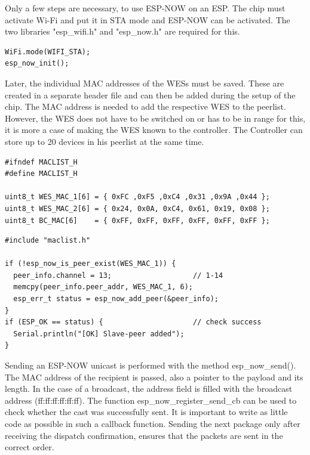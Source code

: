 Only a few steps are necessary, to use ESP-NOW on an ESP.
The chip must activate Wi-Fi and put it in STA mode and ESP-NOW can be activated.
The two libraries "esp\_wifi.h" and "esp\_now.h" are required for this.

\begin{lstlisting}[caption=Init ESP-NOW]
WiFi.mode(WIFI_STA);
esp_now_init();
\end{lstlisting}
\label{lst:init}

Later, the individual MAC addresses of the WESs must be saved.
These are created in a separate header file and can then be added during the setup of the chip.
The MAC address is needed to add the respective WES to the peerlist.
However, the WES does not have to be switched on or has to be in range for this, 
it is more a case of making the WES known to the controller.
The Controller can store up to 20 devices in his peerlist at the same time.

\begin{lstlisting}
#ifndef MACLIST_H
#define MACLIST_H

uint8_t WES_MAC_1[6] = { 0xFC ,0xF5 ,0xC4 ,0x31 ,0x9A ,0x44 };
uint8_t WES_MAC_2[6] = { 0x24, 0x0A, 0xC4, 0x61, 0x19, 0x08 };
uint8_t BC_MAC[6]    = { 0xFF, 0xFF, 0xFF, 0xFF, 0xFF, 0xFF };
\end{lstlisting}
\label{lst:macaddress}

\begin{lstlisting}[caption=Add Peers]
#include "maclist.h"

if (!esp_now_is_peer_exist(WES_MAC_1)) {
  peer_info.channel = 13;                   // 1-14
  memcpy(peer_info.peer_addr, WES_MAC_1, 6);
  esp_err_t status = esp_now_add_peer(&peer_info);
}
if (ESP_OK == status) {                     // check success
  Serial.println("[OK] Slave-peer added"); 
}
\end{lstlisting}

Sending an ESP-NOW unicast is performed with the method esp\_now\_send().
The MAC address of the recipient is passed, also a pointer to the payload and its length.
In the case of a broadcast, the address field is filled with the broadcast address (ff:ff:ff:ff:ff:ff).
The function esp\_now\_register\_send\_cb can be used to check whether the cast was successfully sent.
It is important to write as little code as possible in such a callback function.
Sending the next package only after receiving the dispatch confirmation, 
ensures that the packets are sent in the correct order.

\newpage

